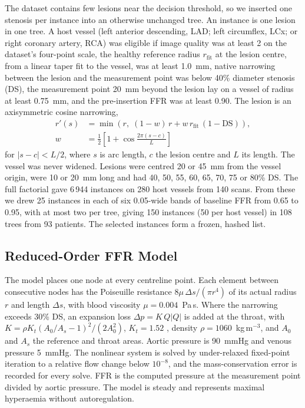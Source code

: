 \documentclass[journal]{IEEEtran}
\begin{document}
The dataset contains few lesions near the decision threshold, so we inserted one stenosis per instance into an
otherwise unchanged tree. An instance is one lesion in one tree. A host vessel (left anterior descending, LAD; left
circumflex, LCx; or right coronary artery, RCA) was eligible if image quality was at least 2 on the dataset's
four-point scale, the healthy reference radius $r_\mathrm{fit}$ at the lesion centre, from a linear taper fit to the
vessel, was at least 1.0~mm, native narrowing between the lesion and the measurement point was below 40\% diameter
stenosis (DS), the measurement point 20~mm beyond the lesion lay on a vessel of radius at least 0.75~mm, and the
pre-insertion FFR was at least 0.90. The lesion is an axisymmetric cosine narrowing,
\begin{equation}
\begin{aligned}
r'(s) &= \min\!\left(r,\; (1-w)\,r + w\,r_\mathrm{fit}\,(1-\mathrm{DS})\right),\\
w &= \tfrac{1}{2}\left[1+\cos\tfrac{2\pi (s-c)}{L}\right]
\end{aligned}
\end{equation}
for $|s-c|<L/2$, where $s$ is arc length, $c$ the lesion centre and $L$ its length. The vessel was never widened.
Lesions were centred 20 or 45~mm from the vessel origin, were 10 or 20~mm long and had 40, 50, 55, 60, 65, 70, 75 or
80\% DS. The full factorial gave 6\,944 instances on 280 host vessels from 140 scans. From these we drew 25 instances
in each of six 0.05-wide bands of baseline FFR from 0.65 to 0.95, with at most two per tree, giving 150 instances
(50 per host vessel) in 108 trees from 93 patients. The selected instances form a frozen, hashed list.

\subsection{Reduced-Order FFR Model}
The model places one node at every centreline point. Each element between consecutive nodes has the Poiseuille
resistance $8\mu\,\Delta s/(\pi r^4)$ of its actual radius $r$ and length $\Delta s$, with blood viscosity
$\mu = 0.004$~Pa\,s. Where the narrowing exceeds 30\% DS, an expansion loss $\Delta p = K\,Q|Q|$ is added at the
throat, with $K = \rho K_t (A_0/A_s - 1)^2 / (2A_0^2)$, $K_t = 1.52$ \cite{young1973}, density $\rho = 1060$~kg\,m$^{-3}$, and $A_0$
and $A_s$ the reference and throat areas. Aortic pressure is 90~mmHg and venous pressure 5~mmHg. The nonlinear
system is solved by under-relaxed fixed-point iteration to a relative flow change below $10^{-8}$, and the
mass-conservation error is recorded for every solve. FFR is the computed pressure at the measurement point divided
by aortic pressure. The model is steady and represents maximal hyperaemia without autoregulation.
\end{document}
